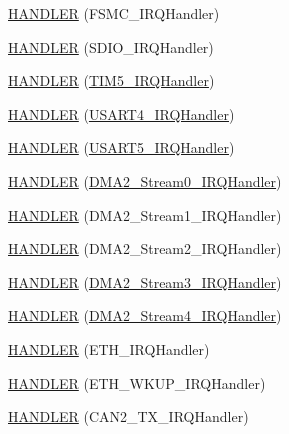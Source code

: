\begin{DoxyCompactItemize}
\item 
\hyperlink{group___p_i_o_s_ga2fba471dc42fb50c0063056bb0dfd836}{H\-A\-N\-D\-L\-E\-R} (F\-S\-M\-C\-\_\-\-I\-R\-Q\-Handler)
\item 
\hyperlink{group___p_i_o_s_gadfe9f029aad3b5f4cdf76a9e963028d7}{H\-A\-N\-D\-L\-E\-R} (S\-D\-I\-O\-\_\-\-I\-R\-Q\-Handler)
\item 
\hyperlink{group___p_i_o_s_gacbcccd459a3932d4322da7c7a5c7872e}{H\-A\-N\-D\-L\-E\-R} (\hyperlink{group___p_i_o_s___t_i_m_ga5e66446caf21dd90191dc07a13ce2378}{T\-I\-M5\-\_\-\-I\-R\-Q\-Handler})
\item 
\hyperlink{group___p_i_o_s_gaede689144bb644321dd432814bf3922b}{H\-A\-N\-D\-L\-E\-R} (\hyperlink{group___p_i_o_s___u_s_a_r_t_gad0d53420fd047695ef9cf3fda8282d9b}{U\-S\-A\-R\-T4\-\_\-\-I\-R\-Q\-Handler})
\item 
\hyperlink{group___p_i_o_s_ga379aa41e763615593630b4a0cf47f68f}{H\-A\-N\-D\-L\-E\-R} (\hyperlink{group___p_i_o_s___u_s_a_r_t_gaea1a468c29d1d6aba1bba3f58c4b3b7e}{U\-S\-A\-R\-T5\-\_\-\-I\-R\-Q\-Handler})
\item 
\hyperlink{group___p_i_o_s_gad1fc97c4859b2ad38ced205b29bcdf78}{H\-A\-N\-D\-L\-E\-R} (\hyperlink{group___tau_labs_core_gaaf6ce196dde98712e1223b99766e06c0}{D\-M\-A2\-\_\-\-Stream0\-\_\-\-I\-R\-Q\-Handler})
\item 
\hyperlink{group___p_i_o_s_gae943fbf2f38d3e771dab065a76be5c12}{H\-A\-N\-D\-L\-E\-R} (D\-M\-A2\-\_\-\-Stream1\-\_\-\-I\-R\-Q\-Handler)
\item 
\hyperlink{group___p_i_o_s_gaa33e17f5fc95cb8d9a26872a8e92520d}{H\-A\-N\-D\-L\-E\-R} (D\-M\-A2\-\_\-\-Stream2\-\_\-\-I\-R\-Q\-Handler)
\item 
\hyperlink{group___p_i_o_s_ga00ad54696a7bfc560abb0204bbc8c71a}{H\-A\-N\-D\-L\-E\-R} (\hyperlink{group___tau_labs_core_ga877135f6494d6923d6f6ec32d75d9eeb}{D\-M\-A2\-\_\-\-Stream3\-\_\-\-I\-R\-Q\-Handler})
\item 
\hyperlink{group___p_i_o_s_ga05944aa0595b1daead2f9f88f04ba2ea}{H\-A\-N\-D\-L\-E\-R} (\hyperlink{group___open_pilot_core_ga295198ed574625d416158a5fc54205ea}{D\-M\-A2\-\_\-\-Stream4\-\_\-\-I\-R\-Q\-Handler})
\item 
\hyperlink{group___p_i_o_s_gaa7e4b5a35c01012524887b1579da87f2}{H\-A\-N\-D\-L\-E\-R} (E\-T\-H\-\_\-\-I\-R\-Q\-Handler)
\item 
\hyperlink{group___p_i_o_s_ga50152e398c00f62171e35ee5eff9abd3}{H\-A\-N\-D\-L\-E\-R} (E\-T\-H\-\_\-\-W\-K\-U\-P\-\_\-\-I\-R\-Q\-Handler)
\item 
\hyperlink{group___p_i_o_s_gae50f2c63fc1727fba00b306499cd8e16}{H\-A\-N\-D\-L\-E\-R} (C\-A\-N2\-\_\-\-T\-X\-\_\-\-I\-R\-Q\-Handler)

\end{DoxyCompactItemize}
